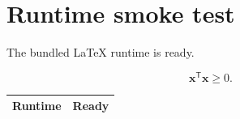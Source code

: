 \documentclass[11pt]{article}
\begin{document}
\section{Runtime smoke test}
\begin{todobox}The bundled LaTeX runtime is ready.\end{todobox}
\[
  \mathbf{x}^{\mathsf T}\mathbf{x} \ge 0.
\]
\begin{tabular}{lr}\toprule Runtime & Ready \\ \bottomrule\end{tabular}
\end{document}
